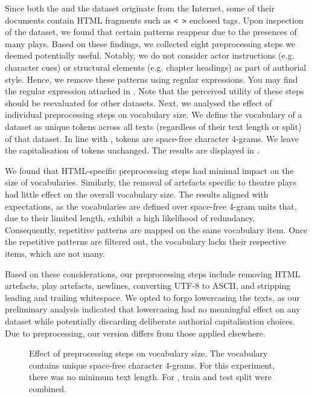 Since both the \dataBlog{} and the \dataPan{} dataset originate from the Internet, some of their documents contain HTML fragments such as \texttt{< >} enclosed tags.
Upon inspection of the \dataGutenberg{} dataset, we found that certain patterns reappear due to the presences of many plays.
Based on these findings, we collected eight preprocessing steps we deemed potentially useful. 
Notably, we do not consider actor instructions (e.g. character cues) or structural elements (e.g. chapter headings) as part of authorial style.
Hence, we remove these patterns using regular expressions.
You may find the regular expression attached in . %
Note that the perceived utility of these steps should be reevaluated for other datasets.
Next, we analysed the effect of individual preprocessing steps on vocabulary size.  
We define the vocabulary of a dataset as unique tokens across all texts (regardless of their text length or split) of that dataset.
In line with \citep{koppel_determining_2014}, tokens are space-free character 4-grams.
We leave the capitalisation of tokens unchanged. 
The results are displayed in .

We found that HTML-specific preprocessing steps had minimal impact on the size of vocabularies.
Similarly, the removal of artefacts specific to theatre plays had little effect on the overall vocabulary size.
The results aligned with expectations, as the vocabularies are defined over space-free 4-gram units that, due to their limited length, exhibit a high likelihood of redundancy.
Consequently, repetitive patterns are mapped on the same vocabulary item.
Once the repetitive patterns are filtered out, the vocabulary lacks their respective items, which are not many.

Based on these considerations, our preprocessing steps include removing HTML artefacts, play artefacts, newlines, converting UTF-8 to ASCII, and stripping leading and trailing whitespace.
We opted to forgo lowercasing the texts, as our preliminary analysis indicated that lowercasing had no meaningful effect on any dataset while potentially discarding deliberate authorial capitalisation choices.
Due to preprocessing, our \dataPan{} version differs from those applied elsewhere.

\begin{figure}[htbp]
    \centering
    
    \caption[Effect of preprocessing steps on vocabulary size.]{Effect of preprocessing steps on vocabulary size. The vocabulary contains unique space-free character 4-grams.
    For this experiment, there was no minimum text length.
    For \dataPan{}, train and test split were combined.}
    \label{fig:preprocesing_impact_vocab_size}
\end{figure}


